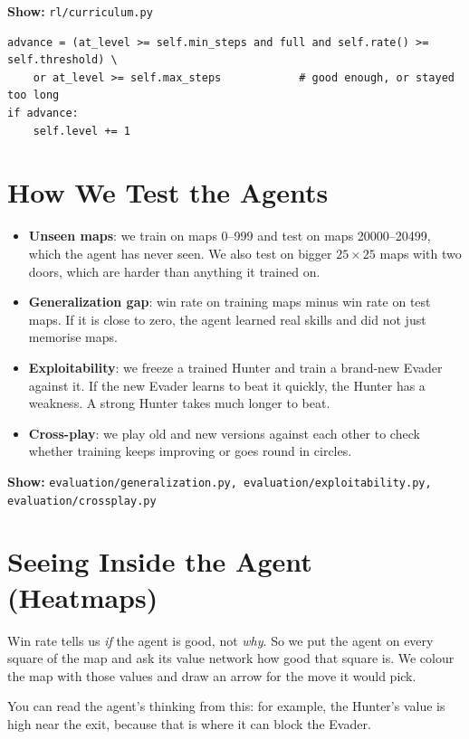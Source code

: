 \documentclass[11pt,a4paper]{article}
\newcommand{\code}[1]{\texttt{#1}}
\newcommand{\showfile}[1]{\par\noindent\textbf{Show:} \code{#1}\par}
\begin{document}
\showfile{rl/curriculum.py}
\begin{lstlisting}
advance = (at_level >= self.min_steps and full and self.rate() >= self.threshold) \
    or at_level >= self.max_steps            # good enough, or stayed too long
if advance:
    self.level += 1
\end{lstlisting}

\section{How We Test the Agents}
\begin{itemize}
  \item \textbf{Unseen maps}: we train on maps 0--999 and test on maps 20000--20499, which the
        agent has never seen. We also test on bigger $25\times25$ maps with two doors, which are
        harder than anything it trained on.
  \item \textbf{Generalization gap}: win rate on training maps minus win rate on test maps. If it is
        close to zero, the agent learned real skills and did not just memorise maps.
  \item \textbf{Exploitability}: we freeze a trained Hunter and train a brand-new Evader against it.
        If the new Evader learns to beat it quickly, the Hunter has a weakness. A strong Hunter
        takes much longer to beat.
  \item \textbf{Cross-play}: we play old and new versions against each other to check whether
        training keeps improving or goes round in circles.
\end{itemize}

\showfile{evaluation/generalization.py, evaluation/exploitability.py, evaluation/crossplay.py}

\section{Seeing Inside the Agent (Heatmaps)}
Win rate tells us \emph{if} the agent is good, not \emph{why}. So we put the agent on every square
of the map and ask its value network how good that square is. We colour the map with those values
and draw an arrow for the move it would pick.

You can read the agent's thinking from this: for example, the Hunter's value is high near the exit,
because that is where it can block the Evader.
\end{document}
